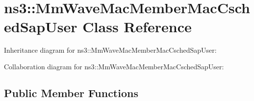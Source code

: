 \hypertarget{classns3_1_1MmWaveMacMemberMacCschedSapUser}{}\section{ns3\+:\+:Mm\+Wave\+Mac\+Member\+Mac\+Csched\+Sap\+User Class Reference}
\label{classns3_1_1MmWaveMacMemberMacCschedSapUser}


Inheritance diagram for ns3\+:\+:Mm\+Wave\+Mac\+Member\+Mac\+Csched\+Sap\+User\+:


Collaboration diagram for ns3\+:\+:Mm\+Wave\+Mac\+Member\+Mac\+Csched\+Sap\+User\+:
\subsection*{Public Member Functions}
